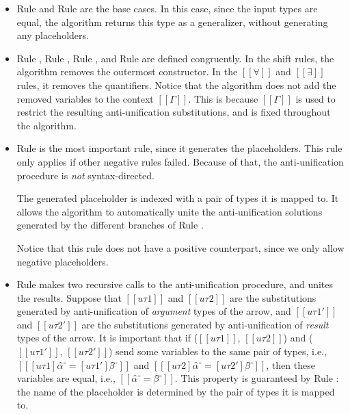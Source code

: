\documentclass[a4,natbib=false]{article}
\newcommand{\ruleref}[1]{Rule \nameref{#1}}
\begin{document}
\begin{itemize}
  \item \ruleref{\ottdruleAUPVarLabel} and \ruleref{\ottdruleAUNVarLabel}
    are the base cases. 
    In this case, since the input types are equal, 
    the algorithm returns this type as a generalizer,
    without generating any placeholders.

  \item \ruleref{\ottdruleAUShiftDLabel}, \ruleref{\ottdruleAUShiftULabel},
    \ruleref{\ottdruleAUForallLabel}, and \ruleref{\ottdruleAUExistsLabel}
    are defined congruently. In the shift rules, the algorithm
    removes the outermost constructor. In the
    $[[∀]]$ and $[[∃]]$ rules, it removes the quantifiers.
    Notice that the algorithm does not add the removed variables to
    the context $[[Γ]]$. This is because $[[Γ]]$
    is used to restrict the resulting anti-unification substitutions, 
    and is fixed throughout the algorithm.

  \item \ruleref{\ottdruleAUAULabel} is the most important rule, 
    since it generates the placeholders. 
    This rule only applies if other negative rules failed.
    Because of that, the anti-unification procedure is 
    \emph{not} syntax-directed. 

    The generated placeholder is indexed with a pair of 
    types it is mapped to. It allows the algorithm to 
    automatically unite the anti-unification solutions 
    generated by the different branches of 
    \ruleref{\ottdruleAUArrowLabel}.

    Notice that this rule does not have a positive counterpart,
    since we only allow negative placeholders.

  \item \ruleref{\ottdruleAUArrowLabel}
    makes two recursive calls to the anti-unification procedure,
    and unites the results. Suppose that
    $[[uτ1]]$  and $[[uτ2]]$ are the substitutions generated by
    anti-unification of \emph{argument} types of the arrow,
    and $[[uτ1']]$ and $[[uτ2']]$ are the substitutions generated by 
    anti-unification of \emph{result} types of the arrow.
    It is important that if ($[[uτ1]]$, $[[uτ2]]$)
    and ($[[uτ1']]$, $[[uτ2']]$) send some variables to the same pair of types,
    i.e., $[[ [uτ1]α̂⁻ = [uτ1']β̂⁻]]$ and $[[ [uτ2]α̂⁻ = [uτ2']β̂⁻]]$,
    then these variables are equal, i.e., $[[α̂⁻ = β̂⁻]]$.
    This property is guaranteed by \ruleref{\ottdruleAUAULabel}:
    the name of the placeholder is determined by the pair of 
    types it is mapped to.
\end{itemize}
\end{document}
